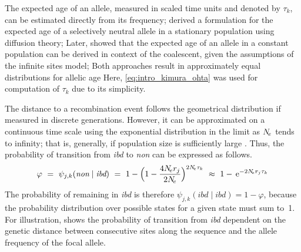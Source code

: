 The expected age of an allele, measured in scaled time units and denoted by $\tau_k$, can be estimated directly from its frequency; 
 \citet{Kimura:1973ug} derived a formulation for the expected age of a selectively neutral allele in a stationary population using diffusion theory; 
Later, \citet{Griffiths:2013ec} showed that the expected age of an allele in a constant population can be derived in context of the coalescent, given the assumptions of the infinite sites model; 
Both approaches result in approximately equal distributions for allelic age
Here, \cref{eq:intro_kimura_ohta} was used for computation of $\tau_k$ due to its simplicity.


The distance to a recombination event follows the geometrical distribution if measured in discrete generations.
However, it can be approximated on a continuous time scale using the exponential distribution in the limit as $N_{\!e}$ tends to infinity; that is, generally, if population size is sufficiently large \citep[see][]{hein2004gene}.
Thus, the probability of transition from \emph{ibd} to \emph{non} can be expressed as follows.
\begin{equation}\label{eq:hmm_trans_prob}
	\varphi ~=~ \psi_{j,k}(\textit{non}\mid\textit{ibd}) ~=~
	1 - \Big( 1 - \frac{4N_{\!e} r_j}{2N_{\!e}} \Big)^{2N_{\!e}\tau_k} ~\approx~
	1 - \,\mathrm{e}^{-2N_{\!e} r_j \tau_k}
\end{equation}
The probability of remaining in \emph{ibd} is therefore ${\psi_{j,k}(\textit{ibd}\mid\textit{ibd}) = 1-\varphi}$, because the probability distribution over possible states for a given state must sum to~1.
For illustration,  shows the probability of transition from \emph{ibd} dependent on the genetic distance between consecutive sites along the sequence and the allele frequency of the focal allele.

